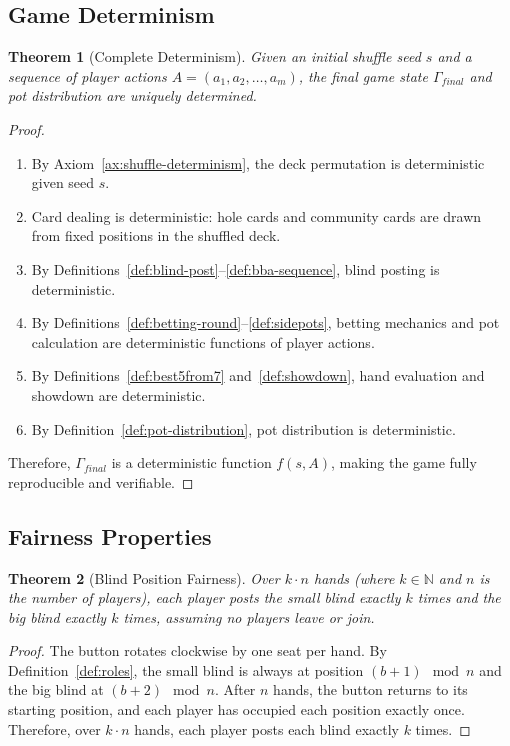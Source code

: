 \documentclass[11pt,a4paper]{article}
\newtheorem{theorem}{Theorem}[section]
\begin{document}
\subsection{Game Determinism}

\begin{theorem}[Complete Determinism]
\label{thm:determinism}
Given an initial shuffle seed $s$ and a sequence of player actions $A = (a_1, a_2, \ldots, a_m)$, the final game state $\Gamma_{final}$ and pot distribution are uniquely determined.
\end{theorem}

\begin{proof}
\begin{enumerate}
    \item By Axiom~\ref{ax:shuffle-determinism}, the deck permutation is deterministic given seed $s$.
    \item Card dealing is deterministic: hole cards and community cards are drawn from fixed positions in the shuffled deck.
    \item By Definitions~\ref{def:blind-post}--\ref{def:bba-sequence}, blind posting is deterministic.
    \item By Definitions~\ref{def:betting-round}--\ref{def:sidepots}, betting mechanics and pot calculation are deterministic functions of player actions.
    \item By Definitions~\ref{def:best5from7} and~\ref{def:showdown}, hand evaluation and showdown are deterministic.
    \item By Definition~\ref{def:pot-distribution}, pot distribution is deterministic.
\end{enumerate}
Therefore, $\Gamma_{final}$ is a deterministic function $f(s, A)$, making the game fully reproducible and verifiable.
\end{proof}

\subsection{Fairness Properties}

\begin{theorem}[Blind Position Fairness]
\label{thm:blind-fairness}
Over $k \cdot n$ hands (where $k \in \mathbb{N}$ and $n$ is the number of players), each player posts the small blind exactly $k$ times and the big blind exactly $k$ times, assuming no players leave or join.
\end{theorem}

\begin{proof}
The button rotates clockwise by one seat per hand. By Definition~\ref{def:roles}, the small blind is always at position $(b+1) \mod n$ and the big blind at $(b+2) \mod n$. After $n$ hands, the button returns to its starting position, and each player has occupied each position exactly once. Therefore, over $k \cdot n$ hands, each player posts each blind exactly $k$ times.
\end{proof}
\end{document}
